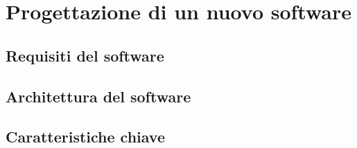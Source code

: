 \chapter{Progettazione di un nuovo software}\label{chap:proposal}
\section{Requisiti del software}
\section{Architettura del software}
\section{Caratteristiche chiave}